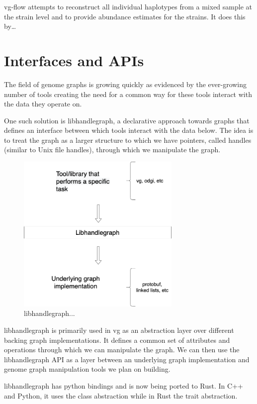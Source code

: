 \documentclass[11pt]{article}
\begin{document}
vg-flow \cite{baaijensStrainawareAssemblyGenomes2020} attempts to reconstruct all 
individual haplotypes from a mixed sample at the strain level and to provide
abundance estimates for the strains. It does this by\ldots{}

\section{Interfaces and APIs}
\label{sec:org8a89157}
The field of genome graphs is growing quickly as evidenced by the ever-growing
number of tools creating the need for a common way for these tools interact with
the data they operate on.

One such solution is libhandlegraph, a declarative approach towards graphs that
defines an interface between which tools interact with the data below. 
The idea is to treat the graph as a larger structure to which we have pointers,
called handles (similar to  Unix file handles), through which we manipulate the
graph. 

\begin{figure}[h]
\centering
\includegraphics[width=0.7\textwidth]{figures/libhandlegraph.png}
\caption{libhandlegraph...}
\end{figure}

libhandlegraph is primarily used in vg as an abstraction layer over different
backing graph implementations.
It defines a common set of attributes and operations through which we can
manipulate the graph. We can then use the libhandlegraph API as a layer between
an underlying graph implementation and genome graph manipulation tools we plan 
on building.

libhandlegraph has python bindings and is now being ported to Rust. In C++ and 
Python, it uses the class abstraction while in Rust the trait abstraction.
\end{document}
